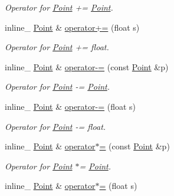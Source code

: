 \begin{DoxyCompactItemize}
\begin{DoxyCompactList}\small\item\em Operator for \hyperlink{class_point}{Point} += \hyperlink{class_point}{Point}. \end{DoxyCompactList}\item 
\hypertarget{class_point_ad3f8a46f565112f45501056100a33859}{inline\+\_\+ \hyperlink{class_point}{Point} \& \hyperlink{class_point_ad3f8a46f565112f45501056100a33859}{operator+=} (float s)}\label{class_point_ad3f8a46f565112f45501056100a33859}

\begin{DoxyCompactList}\small\item\em Operator for \hyperlink{class_point}{Point} += float. \end{DoxyCompactList}\item 
\hypertarget{class_point_acc235529c6962a30a1a3a34064285209}{inline\+\_\+ \hyperlink{class_point}{Point} \& \hyperlink{class_point_acc235529c6962a30a1a3a34064285209}{operator-\/=} (const \hyperlink{class_point}{Point} \&p)}\label{class_point_acc235529c6962a30a1a3a34064285209}

\begin{DoxyCompactList}\small\item\em Operator for \hyperlink{class_point}{Point} -\/= \hyperlink{class_point}{Point}. \end{DoxyCompactList}\item 
\hypertarget{class_point_a4d9ff74b025a509d29eb0a241150b67e}{inline\+\_\+ \hyperlink{class_point}{Point} \& \hyperlink{class_point_a4d9ff74b025a509d29eb0a241150b67e}{operator-\/=} (float s)}\label{class_point_a4d9ff74b025a509d29eb0a241150b67e}

\begin{DoxyCompactList}\small\item\em Operator for \hyperlink{class_point}{Point} -\/= float. \end{DoxyCompactList}\item 
\hypertarget{class_point_ab70d993bc08a203d88dec08d9602fab8}{inline\+\_\+ \hyperlink{class_point}{Point} \& \hyperlink{class_point_ab70d993bc08a203d88dec08d9602fab8}{operator$\ast$=} (const \hyperlink{class_point}{Point} \&p)}\label{class_point_ab70d993bc08a203d88dec08d9602fab8}

\begin{DoxyCompactList}\small\item\em Operator for \hyperlink{class_point}{Point} $\ast$= \hyperlink{class_point}{Point}. \end{DoxyCompactList}\item 
\hypertarget{class_point_aac93f8dc909f672db678faf4333d325d}{inline\+\_\+ \hyperlink{class_point}{Point} \& \hyperlink{class_point_aac93f8dc909f672db678faf4333d325d}{operator$\ast$=} (float s)}\label{class_point_aac93f8dc909f672db678faf4333d325d}


\end{DoxyCompactItemize}
